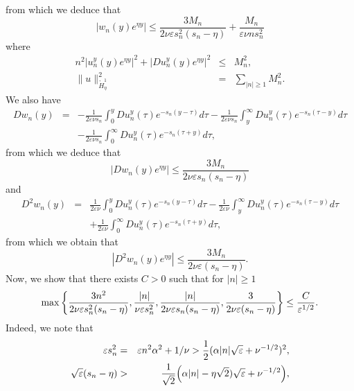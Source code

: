 \documentclass[11pt]{article}
\begin{document}
from which we deduce that 
\begin{equation*}
|w_{n}(y)e^{\eta y}|\leq \frac{3M_{n}}{2\nu \varepsilon s_{n}^{2}(s_{n}-\eta)}+%
\frac{M_{n}}{\varepsilon \nu ns_{n}^{2}}
\end{equation*}%
where%
\begin{eqnarray*}
n^{2}|u_{n}^{y}(y)e^{\eta y}|^{2}+|Du_{n}^{y}(y)e^{\eta y}|^{2} &\leq &M_{n}^{2}, \\
\|u\|_{\mathring{H}_{\eta}^{1}}^{2} &=&\sum_{|n|\geq 1}M_{n}^{2}.
\end{eqnarray*}%
We also have%
\begin{eqnarray*}
Dw_{n}(y) &=&-\frac{1}{2\varepsilon \nu s_{n}}\int_{0}^{y}Du_{n}^{y}(\tau
)e^{-s_{n}(y-\tau )}d\tau -\frac{1}{2\varepsilon \nu s_{n}}\int_{y}^{\infty
}Du_{n}^{y}(\tau )e^{-s_{n}(\tau -y)}d\tau  \\
&&-\frac{1}{2\varepsilon \nu s_{n}}\int_{0}^{\infty }Du_{n}^{y}(\tau
)e^{-s_{n}(\tau +y)}d\tau ,
\end{eqnarray*}%
from which we deduce that 
\begin{equation*}
|Dw_{n}(y)e^{\eta y}|\leq \frac{3M_{n}}{2\nu \varepsilon s_{n}(s_{n}-\eta )}
\end{equation*}%
and%
\begin{eqnarray*}
D^{2}w_{n}(y) &=&\frac{1}{2\varepsilon \nu }\int_{0}^{y}Du_{n}^{y}(\tau
)e^{-s_{n}(y-\tau )}d\tau -\frac{1}{2\varepsilon \nu }\int_{y}^{\infty
}Du_{n}^{y}(\tau )e^{-s_{n}(\tau -y)}d\tau  \\
&&+\frac{1}{2\varepsilon \nu }\int_{0}^{\infty }Du_{n}^{y}(\tau
)e^{-s_{n}(\tau +y)}d\tau ,
\end{eqnarray*}%
from which we obtain that 
\begin{equation*}
|D^{2}w_{n}(y)e^{\eta y}|\leq \frac{3M_{n}}{2\nu \varepsilon (s_{n}-\eta )}.
\end{equation*}%
Now, we show that there exists $C>0$ such that for $|n|\geq 1$ 
\begin{equation}
\max \left\{ \frac{3n^{2}}{2\nu \varepsilon s_{n}^{2}(s_{n}-\eta )},\frac{|n|}{%
\nu \varepsilon s_{n}^{2}},\frac{|n|}{2\nu \varepsilon s_{n}(s_{n}-\eta )},\frac{%
3}{2\nu \varepsilon (s_{n}-\eta )}\right\} \leq \frac{C}{\varepsilon ^{1/2}}.
\label{simple estim}
\end{equation}%
Indeed, we note that%
\begin{eqnarray*}
\varepsilon s_{n}^{2} &=&\varepsilon n^{2}\alpha ^{2}+1/\nu >\frac{1}{2}%
(\alpha |n|\sqrt{\varepsilon }+\nu ^{-1/2})^{2}, \\
\sqrt{\varepsilon }(s_{n}-\eta ) &>&\frac{1}{\sqrt{2}} \Bigl(\alpha |n|-\eta \sqrt{2})%
\sqrt{\varepsilon }+\nu ^{-1/2} \Bigr),
\end{eqnarray*}%
\end{document}
